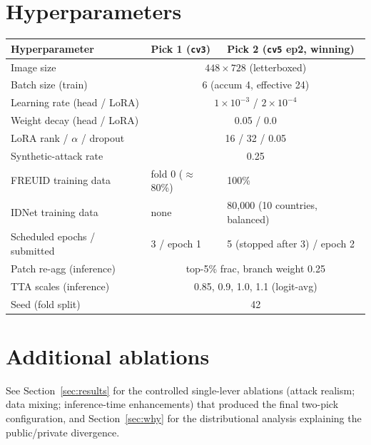 \documentclass[11pt,a4paper]{article}
\begin{document}
\section{Hyperparameters}
\label{app:hparams}
\begin{table}[H]
  \centering
  \small
  \begin{tabular}{lll}
    \toprule
    Hyperparameter & Pick 1 (\texttt{cv3}) & Pick 2 (\texttt{cv5} ep2, winning) \\
    \midrule
    Image size & \multicolumn{2}{c}{$448\times728$ (letterboxed)} \\
    Batch size (train) & \multicolumn{2}{c}{6 (accum 4, effective 24)} \\
    Learning rate (head / LoRA) & \multicolumn{2}{c}{$1\times10^{-3}$ / $2\times10^{-4}$} \\
    Weight decay (head / LoRA) & \multicolumn{2}{c}{0.05 / 0.0} \\
    LoRA rank / $\alpha$ / dropout & \multicolumn{2}{c}{16 / 32 / 0.05} \\
    Synthetic-attack rate & \multicolumn{2}{c}{0.25} \\
    FREUID training data & fold 0 ($\approx$80\%) & 100\% \\
    IDNet training data & none & 80{,}000 (10 countries, balanced) \\
    Scheduled epochs / submitted & 3 / epoch 1 & 5 (stopped after 3) / epoch 2 \\
    Patch re-agg (inference) & \multicolumn{2}{c}{top-5\% frac, branch weight 0.25} \\
    TTA scales (inference) & \multicolumn{2}{c}{0.85, 0.9, 1.0, 1.1 (logit-avg)} \\
    Seed (fold split) & \multicolumn{2}{c}{42} \\
    \bottomrule
  \end{tabular}
\end{table}

\section{Additional ablations}
See Section~\ref{sec:results} for the controlled single-lever ablations (attack
realism; data mixing; inference-time enhancements) that produced the final
two-pick configuration, and Section~\ref{sec:why} for the distributional
analysis explaining the public/private divergence.
\end{document}
